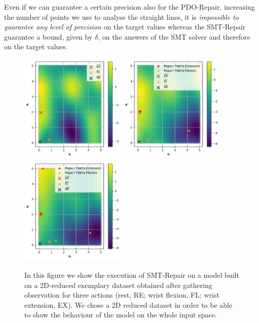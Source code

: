 Even if we can guarantee a certain precision also for the PDO-Repair, increasing the number of points we use to analyse the straight lines, it is \textit{impossible to guarantee any level of precision} on the target values whereas the SMT-Repair guarantee a bound, given by $\delta$, on the answers of the SMT solver and therefore on the target values.
\begin{figure}[H]
    \centering
    \includegraphics[width=0.45\textwidth]{Images/repair-example/SMT-2D-State0.png}
    \includegraphics[width=0.45\textwidth]{Images/repair-example/SMT-2D-State1.png}
    \includegraphics[width=0.45\textwidth]{Images/repair-example/SMT-2D-State2.png}
    \caption{In this figure we show the execution of SMT-Repair on a model built on a 2D-reduced exemplary dataset obtained after gathering observation for three actions (rest, RE; wrist flexion, FL; wrist extension, EX). We chose a 2D reduced dataset in order to be able to show the behaviour of the model on the whole input space.}
    \label{fig:SMT-exec-2D}
\end{figure}
